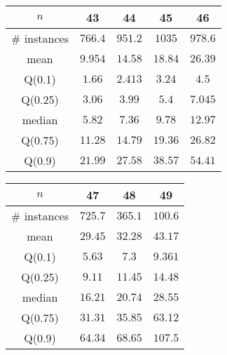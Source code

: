 \begin{tabular}{c|cccc} 
\hline 
$n$ & 43 & 44 & 45 & 46 \tabularnewline 
\hline 
\hline 
\# instances & $766.4$ & $951.2$ & $1035$ & $978.6$ \tabularnewline 
mean & $9.954$ & $14.58$ & $18.84$ & $26.39$ \tabularnewline 
Q(0.1) & $1.66$ & $2.413$ & $3.24$ & $4.5$ \tabularnewline 
Q(0.25) & $3.06$ & $3.99$ & $5.4$ & $7.045$ \tabularnewline 
median & $5.82$ & $7.36$ & $9.78$ & $12.97$ \tabularnewline 
Q(0.75) & $11.28$ & $14.79$ & $19.36$ & $26.82$ \tabularnewline 
Q(0.9) & $21.99$ & $27.58$ & $38.57$ & $54.41$ \tabularnewline 
\hline 
\end{tabular} 
\medskip{} 

\begin{tabular}{c|ccc} 
\hline 
$n$ & 47 & 48 & 49 \tabularnewline 
\hline 
\hline 
\# instances & $725.7$ & $365.1$ & $100.6$ \tabularnewline 
mean & $29.45$ & $32.28$ & $43.17$ \tabularnewline 
Q(0.1) & $5.63$ & $7.3$ & $9.361$ \tabularnewline 
Q(0.25) & $9.11$ & $11.45$ & $14.48$ \tabularnewline 
median & $16.21$ & $20.74$ & $28.55$ \tabularnewline 
Q(0.75) & $31.31$ & $35.85$ & $63.12$ \tabularnewline 
Q(0.9) & $64.34$ & $68.65$ & $107.5$ \tabularnewline 
\hline 
\end{tabular} 
\medskip{} 

